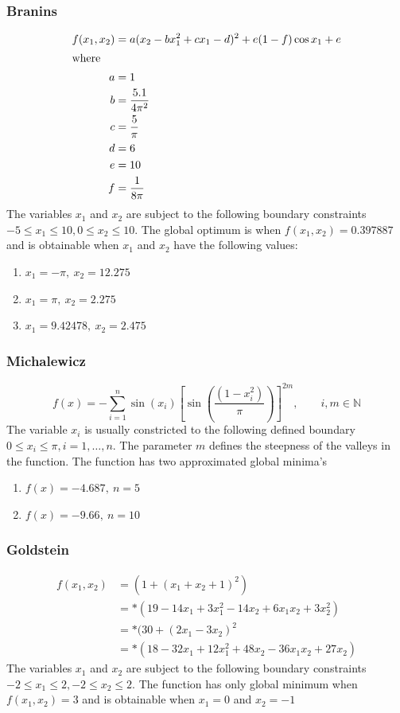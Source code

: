 \subsubsection{Branins}
\begin{align}
	f(x_1,x_2) &= a(x_2 - bx_1^2 + cx_1 - d)^2 + e(1-f)\cos{x_1} + e \\
\intertext{where}
	a &= 1\nonumber\\
	b &= \frac{5.1}{4\pi^2}\nonumber\\
	c &= \frac{5}{\pi}\nonumber\\
	d &= 6\nonumber\\
	e &= 10\nonumber\\
	f &= \frac{1}{8\pi}\nonumber
\end{align}
The variables $x_1$ and $x_2$ are subject to the following boundary constraints $-5\leq x_1 \leq 10, 0 \leq x_2 \leq 10$. The global optimum is when $f(x_1,x_2) = 0.397887$ and is obtainable when $x_1$ and $x_2$ have the following values:
\begin{enumerate}
\item $x_1 = -\pi,\:x_2=12.275$
\item $x_1 = \pi,\:x_2=2.275$
\item $x_1 = 9.42478,\:x_2=2.475$
\end{enumerate}
\subsubsection{Michalewicz}
\begin{equation}
	f(x) = -\sum_{i=1}^n\sin{(x_i)}[\sin{(\frac{(1 - x_i^2)}{\pi})}]^{2m}, \qquad i,m \in \mathbb{N}
\end{equation}
The variable $x_i$ is usually constricted to the following defined boundary $0 \leq x_i \leq \pi, i = 1,\ldots,n$. The parameter $m$ defines the steepness of the valleys in the function. The function has two approximated global minima's
\begin{enumerate}
\item $f(x) = -4.687,\: n = 5$
\item $f(x) = -9.66,\: n = 10$
\end{enumerate}
\subsubsection{Goldstein}
\begin{align}
	f(x_1,x_2) &= (1 + (x_1 + x_2 + 1)^2)\nonumber\\
			   &=*(19-14x_1+3x_1^2 -14x_2 + 6x_1x_2 + 3x_2^2)\nonumber\\
			   &=*(30 + (2x_1 -3x_2)^2\nonumber\\
			   &=*(18 - 32x_1 + 12x_1^2 +48x_2 -36x_1x_2 + 27x_2)\nonumber
\end{align}
The variables $x_1$ and $x_2$ are subject to the following boundary constraints $-2 \leq x_1 \leq 2, -2 \leq x_2 \leq 2$. The function has only global minimum when $f(x_1,x_2) = 3$ and is obtainable when $x_1 = 0$ and $x_2 = -1$
